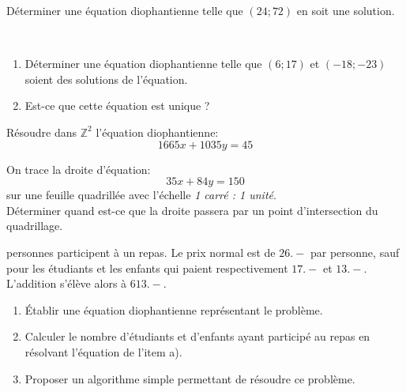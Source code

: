 \begin{exstheorie}
\exo
Déterminer une équation diophantienne telle que $(24;72)$ en soit une solution.





\eexo





\exo
~

\vspace{-7mm}
\begin{enumerate}[label=\alph*),left=0mm,itemsep=0mm]
\item Déterminer une équation diophantienne telle que $(6;17)$ et $(-18;-23)$ soient des solutions de l'équation.
\item Est-ce que cette équation est unique ?
\end{enumerate}






\eexo





\exo
Résoudre dans $\mathbb{Z}^2$ l'équation diophantienne: $$1665x+1035y=45$$ 






\eexo




\exo
On trace la droite d'équation: $$35x+84y=150$$ sur une feuille quadrillée avec l'échelle \textit{1 carré : 1 unité}.\\
Déterminer quand est-ce que la droite passera par un point d'intersection du quadrillage.





\eexo





 personnes participent à un repas. Le prix normal est de $26.-$ par personne, sauf pour les étudiants et les enfants qui paient respectivement $17.-$ et $13.-$.\\
L'addition s'élève alors à $613.-$.

\begin{enumerate}[label=\alph*),left=0mm,itemsep=0mm]
\item Établir une équation diophantienne représentant le problème.
\item Calculer le nombre d'étudiants et d'enfants ayant participé au repas en résolvant l'équation de l'item a).
\item Proposer un algorithme simple permettant de résoudre ce problème.


\end{enumerate}
\end{exstheorie}
